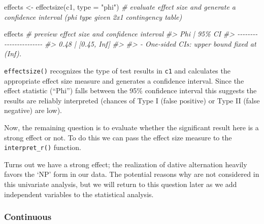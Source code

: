 \documentclass[
]{article}
\newenvironment{Shaded}{\begin{snugshade}}{\end{snugshade}}
\newcommand{\AttributeTok}[1]{\textcolor[rgb]{0.77,0.63,0.00}{#1}}
\newcommand{\CommentTok}[1]{\textcolor[rgb]{0.56,0.35,0.01}{\textit{#1}}}
\newcommand{\FunctionTok}[1]{\textcolor[rgb]{0.00,0.00,0.00}{#1}}
\newcommand{\NormalTok}[1]{#1}
\newcommand{\OtherTok}[1]{\textcolor[rgb]{0.56,0.35,0.01}{#1}}
\newcommand{\SpecialCharTok}[1]{\textcolor[rgb]{0.00,0.00,0.00}{#1}}
\newcommand{\StringTok}[1]{\textcolor[rgb]{0.31,0.60,0.02}{#1}}
\begin{document}
\begin{Shaded}
\begin{Highlighting}[]
\NormalTok{effects }\OtherTok{\textless{}{-}} \FunctionTok{effectsize}\NormalTok{(c1, }\AttributeTok{type =} \StringTok{"phi"}\NormalTok{)  }\CommentTok{\# evaluate effect size and generate a confidence interval (phi type given 2x1 contingency table)}

\NormalTok{effects  }\CommentTok{\# preview effect size and confidence interval}
\CommentTok{\#\textgreater{} Phi  |           95\% CI}
\CommentTok{\#\textgreater{} {-}{-}{-}{-}{-}{-}{-}{-}{-}{-}{-}{-}{-}{-}{-}{-}{-}{-}{-}{-}{-}{-}{-}}
\CommentTok{\#\textgreater{} 0.48 | [0.45,      Inf]}
\CommentTok{\#\textgreater{} }
\CommentTok{\#\textgreater{} {-} One{-}sided CIs: upper bound fixed at (Inf).}
\end{Highlighting}
\end{Shaded}

\texttt{effectsize()} recognizes the type of test results in \texttt{c1} and calculates the appropriate effect size measure and generates a confidence interval. Since the effect statistic (``Phi'') falls between the 95\% confidence interval this suggests the results are reliably interpreted (chances of Type I (false positive) or Type II (false negative) are low).

Now, the remaining question is to evaluate whether the significant result here is a strong effect or not. To do this we can pass the effect size measure to the \texttt{interpret\_r()} function.

\begin{Shaded}
\end{Shaded}

Turns out we have a strong effect; the realization of dative alternation heavily favors the `NP' form in our data. The potential reasons why are not considered in this univariate analysis, but we will return to this question later as we add independent variables to the statistical analysis.

\hypertarget{continuous}{%
\subsubsection{Continuous}\label{continuous}}
\end{document}
